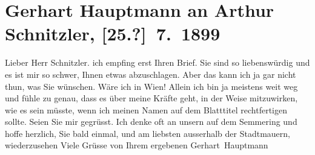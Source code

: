 

               \section[Gerhart Hauptmann an Arthur Schnitzler, {[}25.?{]} 7. 1899]{ Gerhart Hauptmann an Arthur Schnitzler, {[}25.?{]} 7. 1899}\nopagebreak{}\rehead{ }\begin{ledgroupsized}[t]{13cm}\normalsize\beginnumbering{} \toendnotes[C]{\smallbreak\pagebreak[2]} 
\toendnotes[C]{\smallbreak}\pstart{}{\pb}Lieber Herr Schnitzler.\pend\pstart
           ich empfing erst \label{K_L00950_1v}\label{K_L00950_1h}
               Ihren Brief. Sie sind so liebenswürdig und es ist mir so schwer, Ihnen etwas
               abzuschlagen. Aber das kann ich ja gar nicht thun, was Sie wünschen. Wäre ich in Wien! Allein ich bin ja meistens weit weg und fühle zu
               genau, dass es über meine Kräfte geht, in der Weise mitzuwirken, wie es sein müsste,
               wenn ich meinen Namen auf dem Blatttitel rechtfertigen sollte.\pend
           \pstart
           Seien Sie mir gegrüsst. Ich denke oft an unsern \label{K_L00950_2v}\label{K_L00950_2h} auf dem Semmering und hoffe herzlich, Sie
               bald einmal, und am liebsten ausserhalb der Stadtmauern, wiederzusehen\pend
           \pstart Viele Grüsse von Ihrem ergebenen \spacefill\mbox{Gerhart Hauptmann}\pend{}\endnumbering{}\end{ledgroupsized}  \newcommand{\dateiname}{L00950}\newcommand{\titel}{Gerhart Hauptmann an Arthur Schnitzler, [25.?] 7. 1899}\newcommand{\editorInnen}{Martin Anton Müller und Gerd-Hermann Susen}
            \footnotesize
\begin{ledgroupsized}[t]{11.5cm}
\end{ledgroupsized}
         
      